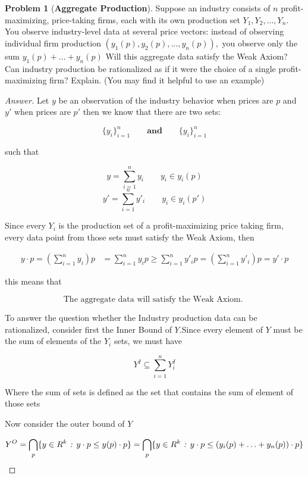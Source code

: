 \documentclass{article}
\theoremstyle{definition}
\newtheorem{problem}{Problem}
\newcommand{\qaq}{\qquad \textbf{and} \qquad}
\newcommand{\settf}{\text{ \emph{:} }}
\begin{document}
\begin{problem}[\textbf{Aggregate Production}]
Suppose an industry consists of $n$ profit-maximizing, price-taking firms, each with its own production set $Y_{1}, Y_{2}, \ldots, Y_{n}$. You observe industry-level data at several price vectors: instead of observing individual firm production $\left(y_{1}(p), y_{2}(p), \ldots, y_{n}(p)\right),$ you observe only the sum $y_{1}(p)+\ldots+y_{n}(p)$ Will this aggregate data satisfy the Weak Axiom? Can industry production be rationalized as if it were the choice of a single profit-maximizing firm? Explain. (You may find it helpful to use an example)
\end{problem}
\begin{proof}[Answer]

Let $y$ be an observation of the industry behavior when prices are $p$ and $y'$ when prices are $p'$ then we know that there are two sets:

$$\{y_i\}_{i=1}^n \qaq \{y_i\}_{i=1}^n$$

such that

$$y = \sum_{i=1}^n{y_i} \qquad y_i \in y_i(p)$$
$$y' = \sum_{i=1}^n{y'_i} \qquad y_i \in y_i(p')$$

Since every $Y_i$ is the production set of a profit-maximizing price taking firm, every data point from those sets must satisfy the Weak Axiom, then

\begin{align*}
    y\cdot p = \left(\sum_{i=1}^n{y_i}\right)p &= \sum_{i=1}^n{y_i}p
    \geq \sum_{i=1}^n{y'_i}p
    = \left(\sum_{i=1}^n{y'_i}\right)p = y'\cdot p 
\end{align*}

this means that

$$\boxed{\text{The aggregate data will satisfy the Weak Axiom. }}$$

To answer the question whether the Industry production data can be rationalized, consider first the Inner Bound of $Y$.Since every element of $Y$ must be the sum of elements of the $Y_i$ sets, we must have

$$Y^I \subseteq \sum_{i=1}^nY^I_i$$

Where the sum of sets is defined as the set that contains the sum of element of those sets

Now consider the outer bound of $Y$

$$Y^O = \bigcap_{p}\{y\in R^k\settf y\cdot p \leq y(p)\cdot p \} = \bigcap_{p}\{y\in R^k\settf y\cdot p \leq (y_i(p)+\ldots+y_n(p)) \cdot p \}$$


\end{proof}
\end{document}
